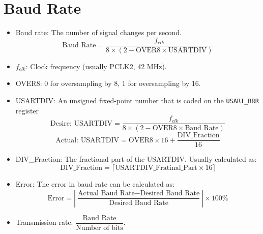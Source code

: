 \documentclass[a4paper,12pt,openany]{book}
\begin{document}
\section{Baud Rate}
\begin{itemize}
    \item Baud rate: The number of signal changes per second. $$\text{Baud Rate}=\dfrac{f_{clk}}{8\times(2-\text{OVER8}\times\text{USARTDIV})}$$
    \item $f_{clk}$: Clock frequency (usually PCLK2, 42 MHz).
    \item OVER8: 0 for oversampling by 8, 1 for oversampling by 16.
    \item USARTDIV: An unsigned fixed-point number that is coded on the \texttt{USART\_BRR} register
    $$\text{Desire:  USARTDIV}=\dfrac{f_{clk}}{8\times(2-\text{OVER8}\times\text{Baud Rate})}$$
    $$\text{Actual:  USARTDIV}=\text{OVER8}\times16+\dfrac{\text{DIV\_Fraction}}{16}$$
    \item DIV\_Fraction: The fractional part of the USARTDIV. Usually calculated as:
    $$\text{DIV\_Fraction}=\lceil\text{USARTDIV\_Fratinal\_Part} \times 16\rceil$$
    \item Error: The error in baud rate can be calculated as:
    $$\text{Error} = \left|\dfrac{\text{Actual Baud Rate} - \text{Desired Baud Rate}}{\text{Desired Baud Rate}}\right| \times 100\%$$
    \item Transmission rate: $\dfrac{\text{Baud Rate}}{\text{Number of bits}}$.
\end{itemize}  
\end{document}
